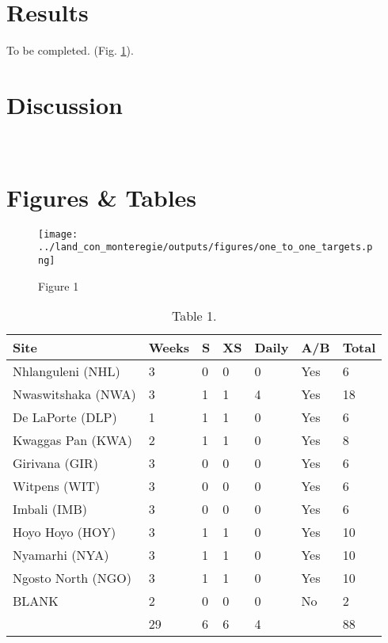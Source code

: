 \section{Results}
To be completed.
(Fig. \ref{fig:map}).
\\
\section{Discussion}
\lipsum[66]
\\

\newpage
\section*{Figures \& Tables}

\begin{figure}[!ht]
  \centering
    \texttt{[image: ../land\_con\_monteregie/outputs/figures/one\_to\_one\_targets.png]}
  \caption{Figure 1}
  \label{fig:map}
\end{figure}

\begin{table}[h!]
\centering
\begin{tabular}{llllll|l}
  \hline
  \hline
  Site & Weeks & S & XS & Daily & A/B & Total\\
  \hline
  Nhlanguleni (NHL) 	& 3 & 0 & 0 & 0 & Yes & 6 \\
  Nwaswitshaka (NWA) 	& 3 & 1 & 1 & 4 & Yes & 18 \\
  De LaPorte (DLP) 		& 1 & 1 & 1 & 0 & Yes & 6 \\
  Kwaggas Pan (KWA) 	& 2 & 1 & 1 & 0 & Yes & 8\\
  Girivana (GIR) 		& 3 & 0 & 0 & 0 & Yes & 6 \\
  Witpens (WIT) 		& 3 & 0 & 0 & 0 & Yes & 6 \\
  Imbali (IMB) 			& 3 & 0 & 0 & 0 & Yes & 6 \\
  Hoyo Hoyo (HOY) 		& 3 & 1 & 1 & 0 & Yes & 10 \\
  Nyamarhi (NYA) 		& 3 & 1 & 1 & 0 & Yes & 10 \\
  Ngosto North (NGO) 	& 3 & 1 & 1 & 0 & Yes &10 \\
  BLANK 				& 2 & 0 & 0 & 0 & No & 2 \\
  \hline
   						& 29 & 6 & 6 & 4 & & 88 \\
  \hline
  \hline
\end{tabular}
\caption{Table 1.}
\label{tab:samples}
\end{table}
